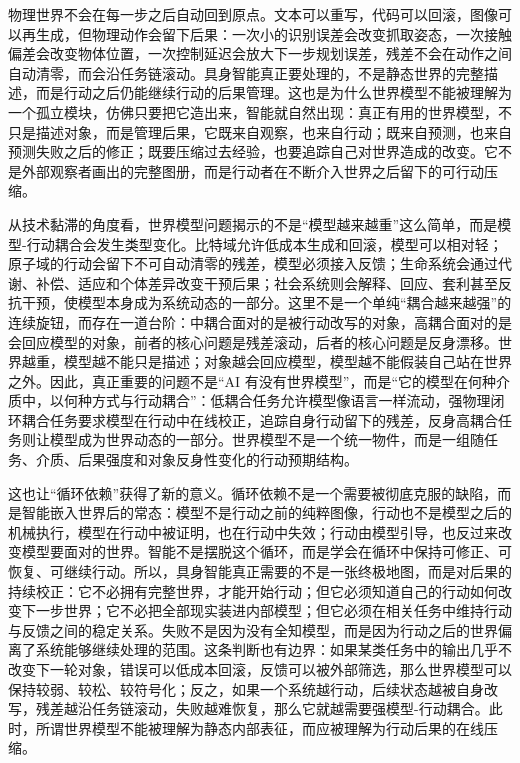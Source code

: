 物理世界不会在每一步之后自动回到原点。文本可以重写，代码可以回滚，图像可以再生成，但物理动作会留下后果：一次小的识别误差会改变抓取姿态，一次接触偏差会改变物体位置，一次控制延迟会放大下一步规划误差，残差不会在动作之间自动清零，而会沿任务链滚动。具身智能真正要处理的，不是静态世界的完整描述，而是行动之后仍能继续行动的后果管理。这也是为什么世界模型不能被理解为一个孤立模块，仿佛只要把它造出来，智能就自然出现：真正有用的世界模型，不只是描述对象，而是管理后果，它既来自观察，也来自行动；既来自预测，也来自预测失败之后的修正；既要压缩过去经验，也要追踪自己对世界造成的改变。它不是外部观察者画出的完整图册，而是行动者在不断介入世界之后留下的可行动压缩。


从技术黏滞的角度看，世界模型问题揭示的不是“模型越来越重”这么简单，而是模型-行动耦合会发生类型变化。比特域允许低成本生成和回滚，模型可以相对轻；原子域的行动会留下不可自动清零的残差，模型必须接入反馈；生命系统会通过代谢、补偿、适应和个体差异改变干预后果；社会系统则会解释、回应、套利甚至反抗干预，使模型本身成为系统动态的一部分。这里不是一个单纯“耦合越来越强”的连续旋钮，而存在一道台阶：中耦合面对的是被行动改写的对象，高耦合面对的是会回应模型的对象，前者的核心问题是残差滚动，后者的核心问题是反身漂移。世界越重，模型越不能只是描述；对象越会回应模型，模型越不能假装自己站在世界之外。因此，真正重要的问题不是“AI 有没有世界模型”，而是“它的模型在何种介质中，以何种方式与行动耦合”：低耦合任务允许模型像语言一样流动，强物理闭环耦合任务要求模型在行动中在线校正，追踪自身行动留下的残差，反身高耦合任务则让模型成为世界动态的一部分。世界模型不是一个统一物件，而是一组随任务、介质、后果强度和对象反身性变化的行动预期结构。

这也让“循环依赖”获得了新的意义。循环依赖不是一个需要被彻底克服的缺陷，而是智能嵌入世界后的常态：模型不是行动之前的纯粹图像，行动也不是模型之后的机械执行，模型在行动中被证明，也在行动中失效；行动由模型引导，也反过来改变模型要面对的世界。智能不是摆脱这个循环，而是学会在循环中保持可修正、可恢复、可继续行动。所以，具身智能真正需要的不是一张终极地图，而是对后果的持续校正：它不必拥有完整世界，才能开始行动；但它必须知道自己的行动如何改变下一步世界；它不必把全部现实装进内部模型；但它必须在相关任务中维持行动与反馈之间的稳定关系。失败不是因为没有全知模型，而是因为行动之后的世界偏离了系统能够继续处理的范围。这条判断也有边界：如果某类任务中的输出几乎不改变下一轮对象，错误可以低成本回滚，反馈可以被外部筛选，那么世界模型可以保持较弱、较松、较符号化；反之，如果一个系统越行动，后续状态越被自身改写，残差越沿任务链滚动，失败越难恢复，那么它就越需要强模型-行动耦合。此时，所谓世界模型不能被理解为静态内部表征，而应被理解为行动后果的在线压缩。


